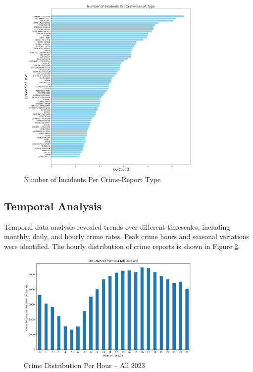 \documentclass{article}
\begin{document}
\begin{figure}[!htbp]
    \centering
    \includegraphics[width=0.8\textwidth]{Figures/Number of Incidents Per Crime-Report Type.png}
    \caption{Number of Incidents Per Crime-Report Type}
    \label{fig:crime-report}
\end{figure}

\subsection{Temporal Analysis}

Temporal data analysis revealed trends over different timescales, including monthly, daily, and hourly crime rates. Peak crime hours and seasonal variations were identified. The hourly distribution of crime reports is shown in Figure \ref{fig:crime-hour}.

\begin{figure}[!htbp]
    \centering
    \includegraphics[width=0.8\textwidth]{Figures/Crime Distribution Per Hour (All Dataset).png}
    \caption{Crime Distribution Per Hour -- All 2023}
    \label{fig:crime-hour}
\end{figure}
\end{document}
